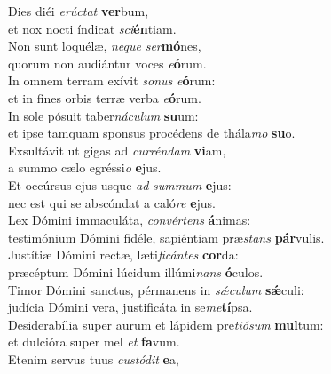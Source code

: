 \evenverse Dies diéi \textit{e}\textit{rú}\textit{ctat} \textbf{ver}bum,~\*\\
\evenverse et nox nocti índicat \textit{sci}\textbf{én}tiam.\\
\oddverse Non sunt loquélæ, \textit{ne}\textit{que} \textit{ser}\textbf{mó}nes,~\*\\
\oddverse quorum non audiántur voces \textit{e}\textbf{ó}rum.\\
\evenverse In omnem terram exívit \textit{so}\textit{nus} \textit{e}\textbf{ó}rum:~\*\\
\evenverse et in fines orbis terræ verba \textit{e}\textbf{ó}rum.\\
\oddverse In sole pósuit taber\textit{ná}\textit{cu}\textit{lum} \textbf{su}um:~\*\\
\oddverse et ipse tamquam sponsus procédens de thála\textit{mo} \textbf{su}o.\\
\evenverse Exsultávit ut gigas ad \textit{cur}\textit{rén}\textit{dam} \textbf{vi}am,~\*\\
\evenverse a summo cælo egréssi\textit{o} \textbf{e}jus.\\
\oddverse Et occúrsus ejus usque \textit{ad} \textit{sum}\textit{mum} \textbf{e}jus:~\*\\
\oddverse nec est qui se abscóndat a caló\textit{re} \textbf{e}jus.\\
\evenverse Lex Dómini immaculáta, \textit{con}\textit{vér}\textit{tens} \textbf{á}nimas:~\*\\
\evenverse testimónium Dómini fidéle, sapiéntiam præ\textit{stans} \textbf{pár}vulis.\\
\oddverse Justítiæ Dómini rectæ, læti\textit{fi}\textit{cán}\textit{tes} \textbf{cor}da:~\*\\
\oddverse præcéptum Dómini lúcidum illúmi\textit{nans} \textbf{ó}culos.\\
\evenverse Timor Dómini sanctus, pérmanens in \textit{sǽ}\textit{cu}\textit{lum} \textbf{sǽ}culi:~\*\\
\evenverse judícia Dómini vera, justificáta in se\textit{me}\textbf{tí}psa.\\
\oddverse Desiderabília super aurum et lápidem pre\textit{ti}\textit{ó}\textit{sum} \textbf{mul}tum:~\*\\
\oddverse et dulcióra super mel \textit{et} \textbf{fa}vum.\\
\evenverse Etenim servus tuus \textit{cu}\textit{stó}\textit{dit} \textbf{e}a,~\*\\
